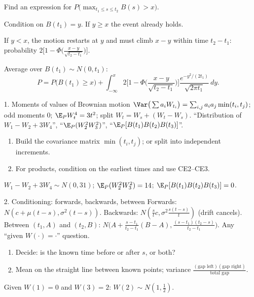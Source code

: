 \begin{problem}
Find an expression for $P\big(\max_{t_1\le s\le t_2}B(s)>x\big)$.
\begin{steps}
  \item Condition on $B(t_1)=y$. If $y\ge x$ the event already holds.
  \item If $y<x$, the motion restarts at $y$ and must climb $x-y$ within time $t_2-t_1$: probability $2\big[1-\Phi\big(\frac{x-y}{\sqrt{t_2-t_1}}\big)\big]$.
  \item Average over $B(t_1)\sim N(0,t_1)$:
  \[
    P=P\big(B(t_1)\ge x\big)+\int_{-\infty}^x2\Big[1-\Phi\Big(\frac{x-y}{\sqrt{t_2-t_1}}\Big)\Big]\frac{e^{-y^2/(2t_1)}}{\sqrt{2\pi t_1}}\,dy .
  \]
\end{steps}
\end{problem}


\begin{card}{1. Moments of values of Brownian motion}
\Formula
$\Var\big(\sum a_iW_{t_i}\big)=\sum_{i,j}a_ia_j\min(t_i,t_j)$; odd moments $0$; $\E_PW_t^4=3t^2$; split $W_t=W_s+(W_t-W_s)$.
\UseWhen
``Distribution of $W_1-W_2+3W_4$'', ``$\E_P(W_2^2W_3^2)$'', ``$\E_P[B(t_1)B(t_2)B(t_3)]$''.
\HowTo
\begin{enumerate}
  \item Build the covariance matrix $\min(t_i,t_j)$; or split into independent increments.
  \item For products, condition on the earliest times and use CE2--CE3.
\end{enumerate}
\Caveats
{}
\begin{cardex}
$W_1-W_2+3W_4\sim N(0,31)$; $\E_P(W_2^2W_3^2)=14$; $\E_P[B(t_1)B(t_2)B(t_3)]=0$.
\end{cardex}
\end{card}

\begin{card}{2. Conditioning: forwards, backwards, between}
\Formula
Forwards: $N(c+\mu(t-s),\sigma^2(t-s))$. Backwards: $N(\frac stc,\sigma^2\frac{s(t-s)}t)$ (drift cancels). Between $(t_1,A)$ and $(t_2,B)$: $N\big(A+\frac{s-t_1}{t_2-t_1}(B-A),\frac{(s-t_1)(t_2-s)}{t_2-t_1}\big)$.
\UseWhen
Any ``given $W(\cdot)=\cdot$'' question.
\HowTo
\begin{enumerate}
  \item Decide: is the known time before or after $s$, or both?
  \item Mean on the straight line between known points; variance $\frac{(\text{gap left})(\text{gap right})}{\text{total gap}}$.
\end{enumerate}
\Caveats
{}
\begin{cardex}
Given $W(1)=0$ and $W(3)=2$: $W(2)\sim N(1,\frac12)$.
\end{cardex}
\end{card}


